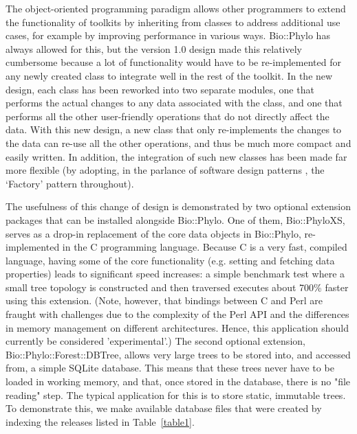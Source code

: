 \documentclass{bioinfo}
\begin{document}
The object-oriented programming paradigm allows other programmers to extend the 
functionality of toolkits by inheriting from classes to address additional use cases, for 
example by improving performance in various ways. Bio::Phylo has always allowed for this, 
but the version 1.0 design made this relatively cumbersome because a lot of functionality 
would have to be re-implemented for any newly created class to integrate well in the rest 
of the toolkit. In the new design, each class has been reworked into two separate modules, 
one that performs the actual changes to any data associated with the class, and one that 
performs all the other user-friendly operations that do not directly affect the data. With 
this new design, a new class that only re-implements the changes to the data can re-use 
all the other operations, and thus be much more compact and easily written. In addition, 
the integration of such new classes has been made far more flexible (by adopting, in the 
parlance of software design patterns \citep{Gamma1995}, the `Factory' pattern throughout).

The usefulness of this change of design is demonstrated by two optional extension packages
that can be installed alongside Bio::Phylo. One of them, Bio::PhyloXS, serves as a drop-in
replacement of the core data objects in Bio::Phylo, re-implemented in the C programming
language. Because C is a very fast, compiled language, having some of the core 
functionality (e.g. setting and fetching data properties) leads to significant speed 
increases: a simple benchmark test where a small tree topology is constructed and then
traversed executes about 700\% faster using this extension. (Note, however, that bindings
between C and Perl are fraught with challenges due to the complexity of the Perl API and
the differences in memory management on different architectures. Hence, this application
should currently be considered 'experimental'.) The second optional extension,
Bio::Phylo::Forest::DBTree, allows very large trees to be stored into, and accessed from,
a simple SQLite database. This means that these trees never have to be loaded in working
memory, and that, once stored in the database, there is no "file reading" step. The 
typical application for this is to store static, immutable trees. To demonstrate this, we
make available database files that were created by indexing the releases listed in 
Table~\ref{table1}.
\end{document}
